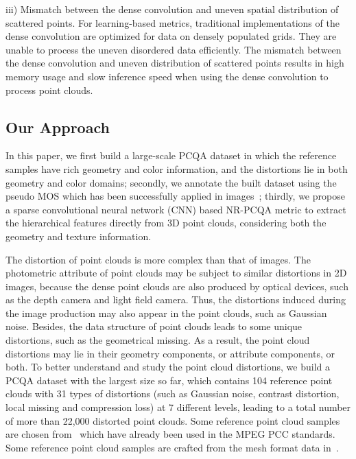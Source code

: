 \documentclass[acmsmall]{acmart}
\begin{document}
\par iii) Mismatch between the dense convolution and uneven spatial distribution of scattered points. For learning-based metrics, traditional implementations of the dense convolution are optimized for data on densely populated grids. They are unable to process the uneven disordered data efficiently. The mismatch between the dense convolution and uneven distribution of scattered points results in high memory usage and slow inference speed when using the dense convolution to process point clouds.

\subsection{Our Approach}

\par In this paper, we first build a large-scale PCQA dataset in which the reference  samples have rich geometry and color information, and the distortions lie in both geometry and color domains; secondly, we annotate the built dataset using the pseudo MOS which has been successfully applied in images~\cite{Wu2020PesudoMOS}; thirdly, we propose a sparse convolutional neural network (CNN) based NR-PCQA metric to extract the hierarchical features directly from 3D point clouds, considering both the geometry and texture information.

\par The distortion of point clouds is more complex than that of images. The photometric attribute of point clouds may be subject to similar distortions in 2D images, because the dense point clouds are also produced by optical devices, such as the depth camera and light field camera. Thus, the distortions induced during the image production may also appear in the point clouds, such as Gaussian noise. Besides, the data structure of point clouds leads to some unique distortions, such as the geometrical missing. As a result, the point cloud distortions may lie in their geometry components, or attribute components, or both. To better understand and study the point cloud distortions, we build a PCQA dataset with the largest size so far, which contains 104 reference point clouds with 31 types of distortions (such as Gaussian noise, contrast distortion, local missing and compression loss) at 7 different levels, leading to a total number of more than 22,000 distorted point clouds. Some reference point cloud samples are chosen from~\cite{Mpeg1,Mpeg2,JPEG,Mpeg3,Nouri2017Greyc} which have already been used in the MPEG PCC standards. Some reference point cloud samples are crafted from the mesh format data in~\cite{free3d,sketchfab}.
\end{document}
